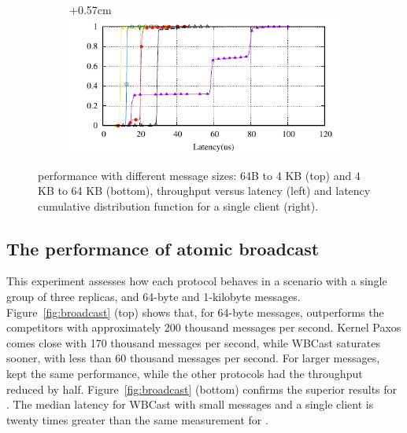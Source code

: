 \begin{figure}[htp!]
\begin{subfigure}{\columnwidth}
  \end{subfigure}
  \begin{subfigure}{\columnwidth}
    \advance\leftskip+0.57cm
    \includegraphics[width=0.96\columnwidth]{figures/benchmark/graphs/figure-performance-vs-size-single-group-cdf-from-4k}
  \end{subfigure}
  \caption{\libname performance with different message sizes: 64B to 4 KB (top) and 4 KB to 64 KB (bottom), throughput versus latency (left) and latency cumulative distribution function for a single client (right).}
  \label{fig:1group_message_size}
\end{figure}

\subsection{The performance of atomic broadcast}
\label{sec:evaluation:broadcast}

This experiment assesses how each protocol behaves in a scenario with a single group of three replicas, and 64-byte and 1-kilobyte messages.
Figure~\ref{fig:broadcast} (top) shows that, for 64-byte messages, \libname outperforms the competitors with approximately 200 thousand messages per second. 
Kernel Paxos comes close with 170 thousand messages per second, while WBCast saturates sooner, with less than 60 thousand messages per second.
For larger messages, \libname kept the same performance, while the other protocols had the throughput reduced by half.
Figure~\ref{fig:broadcast} (bottom) confirms the superior results for \libname. The median latency for WBCast with small messages and a single client is twenty times greater than the same measurement for \libname.

